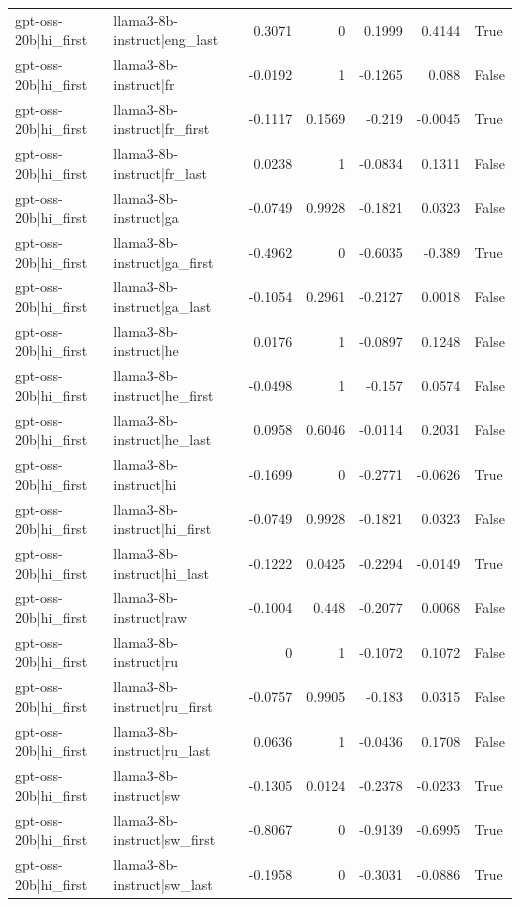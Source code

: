 \begin{table}
\begin{tabular}{l l r r r r l}
gpt-oss-20b|hi_first & llama3-8b-instruct|eng_last & 0.3071 & 0 & 0.1999 & 0.4144 & True \\
gpt-oss-20b|hi_first & llama3-8b-instruct|fr & -0.0192 & 1 & -0.1265 & 0.088 & False \\
gpt-oss-20b|hi_first & llama3-8b-instruct|fr_first & -0.1117 & 0.1569 & -0.219 & -0.0045 & True \\
gpt-oss-20b|hi_first & llama3-8b-instruct|fr_last & 0.0238 & 1 & -0.0834 & 0.1311 & False \\
gpt-oss-20b|hi_first & llama3-8b-instruct|ga & -0.0749 & 0.9928 & -0.1821 & 0.0323 & False \\
gpt-oss-20b|hi_first & llama3-8b-instruct|ga_first & -0.4962 & 0 & -0.6035 & -0.389 & True \\
gpt-oss-20b|hi_first & llama3-8b-instruct|ga_last & -0.1054 & 0.2961 & -0.2127 & 0.0018 & False \\
gpt-oss-20b|hi_first & llama3-8b-instruct|he & 0.0176 & 1 & -0.0897 & 0.1248 & False \\
gpt-oss-20b|hi_first & llama3-8b-instruct|he_first & -0.0498 & 1 & -0.157 & 0.0574 & False \\
gpt-oss-20b|hi_first & llama3-8b-instruct|he_last & 0.0958 & 0.6046 & -0.0114 & 0.2031 & False \\
gpt-oss-20b|hi_first & llama3-8b-instruct|hi & -0.1699 & 0 & -0.2771 & -0.0626 & True \\
gpt-oss-20b|hi_first & llama3-8b-instruct|hi_first & -0.0749 & 0.9928 & -0.1821 & 0.0323 & False \\
gpt-oss-20b|hi_first & llama3-8b-instruct|hi_last & -0.1222 & 0.0425 & -0.2294 & -0.0149 & True \\
gpt-oss-20b|hi_first & llama3-8b-instruct|raw & -0.1004 & 0.448 & -0.2077 & 0.0068 & False \\
gpt-oss-20b|hi_first & llama3-8b-instruct|ru & 0 & 1 & -0.1072 & 0.1072 & False \\
gpt-oss-20b|hi_first & llama3-8b-instruct|ru_first & -0.0757 & 0.9905 & -0.183 & 0.0315 & False \\
gpt-oss-20b|hi_first & llama3-8b-instruct|ru_last & 0.0636 & 1 & -0.0436 & 0.1708 & False \\
gpt-oss-20b|hi_first & llama3-8b-instruct|sw & -0.1305 & 0.0124 & -0.2378 & -0.0233 & True \\
gpt-oss-20b|hi_first & llama3-8b-instruct|sw_first & -0.8067 & 0 & -0.9139 & -0.6995 & True \\
gpt-oss-20b|hi_first & llama3-8b-instruct|sw_last & -0.1958 & 0 & -0.3031 & -0.0886 & True \\

\end{tabular}
\end{table}
